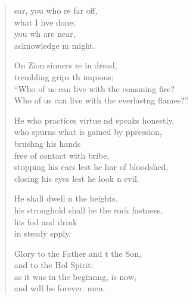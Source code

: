 \settowidth{\versewidth}{Who of us can live with the everlasting flames?”}
\begin{verse}%
  \begin{patverse}
ear, you who re far off,\Med\\
what I hve done;\\
you wh are near,\Med\\
acknowledge m might.

On Zion sinners re in dread,\Med\\
trembling grips th impious;\\
“Who of us can live with the consming fire?\Med\\
Who of us can live with the everlast\pointup{\i}ng flames?”

He who practices virtue nd speaks honestly,\Med\\
who spurns what is gained by ppression,\\
brush\pointup{\i}ng his hands\Med\\
free of contact with  bribe,\\
stopping his ears lest he har of bloodshed,\Med\\
closing his eyes lest he look n evil.

He shall dwell n the heights,\Med\\
his stronghold shall be the rock fastness,\\
his fod and drink\Med\\
in steady spply.

Glory to the Father and t the Son,\Med\\
and to the Hol Spirit:\\
as it was in the beginn\pointup{\i}ng, is now,\Med\\
and will be forever. men. 
  \end{patverse}
\end{verse}
